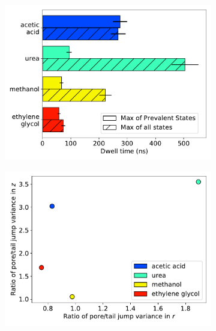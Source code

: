 \documentclass{article}
\begin{document}
\begin{figure}
\begin{subfigure}{0.45\textwidth}
  \caption{}\label{fig:rdf_summary}
  \end{subfigure}
  \begin{subfigure}{0.45\textwidth}
  \includegraphics[width=\textwidth]{dwell_time_summary.pdf}
  \caption{}\label{fig:dwell_time_summary}
  \end{subfigure}
  \begin{subfigure}{0.45\textwidth}
  \includegraphics[width=\textwidth]{cov_summary.pdf}
  \caption{}\label{fig:cov_summary}
  \end{subfigure}

\end{figure}
\end{document}
